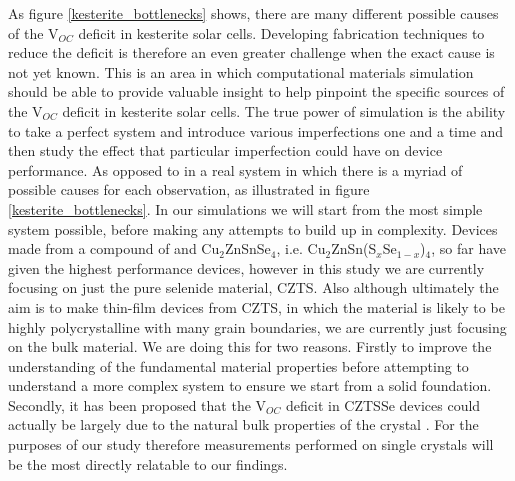 As figure \ref{kesterite_bottlenecks} shows, there are many different possible causes of the  V$_{OC}$ deficit in kesterite solar cells. Developing fabrication techniques to reduce the deficit is therefore an even greater challenge when the exact cause is not yet known.
This is an area in which computational materials simulation should be able to provide valuable insight to help pinpoint the specific sources of the V$_{OC}$ deficit in kesterite solar cells. The true power of simulation is the ability to take a perfect system and introduce various imperfections one and a time and then study the effect that particular imperfection could have on device performance. As opposed to in a real system in which there is a myriad of possible causes for each observation, as illustrated in figure \ref{kesterite_bottlenecks}.
In our simulations we will start from the most simple system possible, before making any attempts to build up in complexity. Devices made from a compound of \CZTS and Cu$_2$ZnSnSe$_4$, i.e. Cu$_2$ZnSn(S$_x$Se$_{1-x}$)$_4$, so far have given the highest performance devices, however in this study we are currently focusing on just the pure selenide material, CZTS. Also although ultimately the aim is to make thin-film devices from CZTS, in which the material is likely to be highly polycrystalline with many grain boundaries, we are currently just focusing on the bulk material. We are doing this for two reasons. Firstly to improve the understanding of the fundamental material properties before attempting to understand a more complex system to ensure we start from a solid foundation. Secondly, it has been proposed that the V$_{OC}$ deficit in CZTSSe devices could actually be largely due to the natural bulk properties of the crystal \cite{culprit_5}. For the purposes of our study therefore measurements performed on single crystals will be the most directly relatable to our findings.\\

